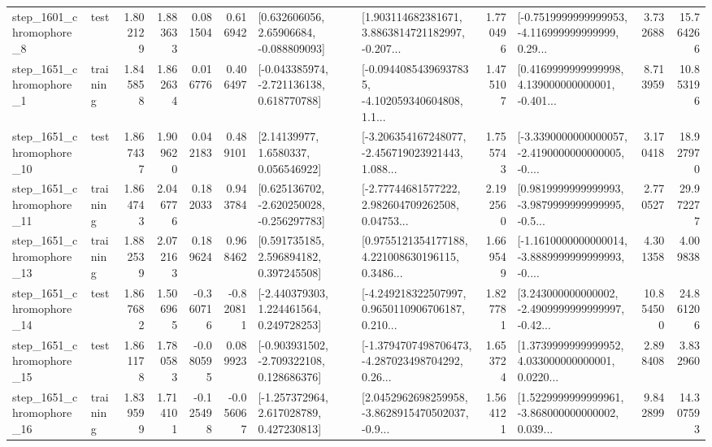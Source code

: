 \begin{tabular}{llrrrrllrlrr}
  step\_1601\_chromophore\_8 &      test &      1.802129 &    1.883633 &      0.081504 &  0.616942 &     [0.632606056, 2.65906684, -0.088809093] &  [1.903114682381671, 3.8863814721182997, -0.207... &       1.770496 &  [-0.7519999999999953, -4.116999999999999, 0.29... &            3.732688 &         15.764266 \\
  step\_1651\_chromophore\_1 &  training &      1.845858 &    1.862634 &      0.016776 &  0.406497 &   [-0.043385974, -2.721136138, 0.618770788] &  [-0.09440854396937835, -4.102059340604808, 1.1... &       1.475107 &  [0.4169999999999998, 4.139000000000001, -0.401... &            8.713959 &         10.853196 \\
 step\_1651\_chromophore\_10 &      test &      1.867437 &    1.909620 &      0.042183 &  0.489101 &        [2.14139977, 1.6580337, 0.056546922] &  [-3.206354167248077, -2.456719023921443, 1.088... &       1.755743 &  [-3.3390000000000057, -2.4190000000000005, -0.... &            3.170418 &         18.927970 \\
 step\_1651\_chromophore\_11 &  training &      1.864743 &    2.046776 &      0.182033 &  0.943784 &   [0.625136702, -2.620250028, -0.256297783] &  [-2.77744681577222, 2.982604709262508, 0.04753... &       2.192560 &  [0.9819999999999993, -3.9879999999999995, -0.5... &            2.770527 &         29.972277 \\
 step\_1651\_chromophore\_13 &  training &      1.882539 &    2.072163 &      0.189624 &  0.968462 &     [0.591735185, 2.596894182, 0.397245508] &  [0.9755121354177188, 4.221008630196115, 0.3486... &       1.669549 &  [-1.1610000000000014, -3.8889999999999993, -0.... &            4.301358 &          4.009838 \\
 step\_1651\_chromophore\_14 &      test &      1.867682 &    1.506965 &     -0.360716 & -0.820811 &    [-2.440379303, 1.224461564, 0.249728253] &  [-4.249218322507997, 0.9650110906706187, 0.210... &       1.827781 &  [3.243000000000002, -2.4909999999999997, -0.42... &           10.854500 &         24.861206 \\
 step\_1651\_chromophore\_15 &      test &      1.861178 &    1.780583 &     -0.080595 &  0.089923 &   [-0.903931502, -2.709322108, 0.128686376] &  [-1.3794707498706473, -4.287023498704292, 0.26... &       1.653724 &  [1.3739999999999952, 4.033000000000001, 0.0220... &            2.898408 &          3.832960 \\
 step\_1651\_chromophore\_16 &  training &      1.839599 &    1.714101 &     -0.125498 & -0.056067 &    [-1.257372964, 2.617028789, 0.427230813] &  [2.0452962698259958, -3.8628915470502037, -0.9... &       1.564121 &  [1.5229999999999961, -3.868000000000002, 0.039... &            9.842899 &         14.307593 \\

\end{tabular}
